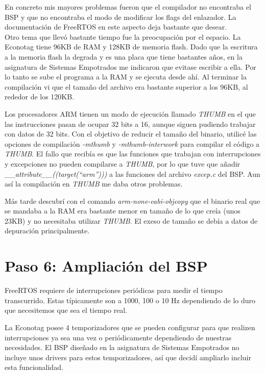 En concreto mis mayores problemas fueron que el compilador no encontraba el BSP y que no encontraba el modo de modificar los flags del enlazador.
La documentación de FreeRTOS en este aspecto deja bastante que desear.\\

Otro tema que llevó bastante tiempo fue la preocupación por el espacio. La Econotag tiene 96KB de RAM y 128KB de memoria flash. Dado que la escritura a la memoria flash la degrada y es una placa que tiene bastantes años, en la asignatura de Sistemas Empotrados me indicaron que evitase escribir a ella. Por lo tanto se sube el programa a la RAM y se ejecuta desde ahí. Al terminar la compilación vi que el tamaño del archivo era bastante superior a los 96KB, al rededor de los 120KB. 

Los procesadores ARM tienen un modo de ejecución llamado \emph{THUMB} en el que las instrucciones pasan de ocupar 32 bits a 16, aunque siguen pudiendo trabajar con datos de 32 bits. Con el objetivo de reducir el tamaño del binario, utilicé las opciones de compilación \emph{-mthumb} y \emph{-mthumb-interwork} para compilar el código a \emph{THUMB}. El fallo que recibía es que las funciones que trabajan con interrupciones y excepciones no pueden compilarse a \emph{THUMB}, por lo que tuve que añadir \emph{ \_\_attribute\_\_((target(``arm'')))} a las funciones del archivo \emph{excep.c} del BSP. Aun así la compilación en \emph{THUMB} me daba otros problemas.

Más tarde descubrí con el comando \emph{arm-none-eabi-objcopy} que el binario real que se mandaba a la RAM era bastante menor en tamaño de lo que creía (unos 23KB) y no necesitaba utilizar \emph{THUMB}. El exeso de tamaño se debía a datos de depuración principalmente.

\section{Paso 6: Ampliación del BSP}
FreeRTOS requiere de interrupciones periódicas para medir el tiempo transcurrido. Estas típicamente son a 1000, 100 o 10 Hz dependiendo de lo duro que necesitemos que sea el tiempo real.

La Econotag posee 4 temporizadores que se pueden configurar para que realizen interrupciones ya sea una vez o periódicamente dependiendo de nuestras necesidades. El BSP diseñado en la asignatura de Sistemas Empotrados no incluye unos drivers para estos temporizadores, así que decidí ampliarlo incluir esta funcionalidad.\\

